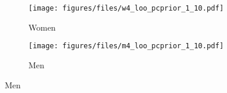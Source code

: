 \begin{figure}[htp]
\caption{Q-Q Plot PIT \newline Model \textit{Covariates} in Tables \ref{tbl:w_age_pcprior_1_10} and \ref{tbl:m_age_pcprior_1_10}}
\centering

  \begin{subfigure}[b]{.50\linewidth}
    \centering
       \caption{Women}
    \texttt{[image: figures/files/w4\_loo\_pcprior\_1\_10.pdf]}
  \end{subfigure}%

 \begin{subfigure}[b]{.50\linewidth}
   \caption{Men}
    \centering
    \texttt{[image: figures/files/m4\_loo\_pcprior\_1\_10.pdf]}
  \end{subfigure}%
  \label{fig:qqplot_pcprior_1_10}
\end{figure}
